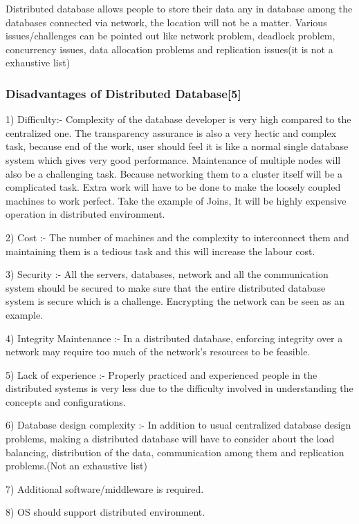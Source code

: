 \documentclass{article}[12pt,a4paper]
\begin{document}
Distributed database allows people to store their data any in database among the databases connected via network, the location will not be a matter. Various issues/challenges can be pointed out like network problem, deadlock problem, concurrency issues, data allocation problems and replication issues(it is not a exhaustive list)

\subsubsection {Disadvantages of Distributed Database[5]}

1) Difficulty:- Complexity of the database developer is very high compared to the centralized one. The transparency assurance is also a very hectic and complex task, because end of the work, user should feel it is like a normal single database system which gives very good performance. Maintenance of multiple nodes will also be a challenging task. Because networking them to a cluster itself will be a complicated task. Extra work will have to be done to make the loosely coupled machines to work perfect. Take the example of Joins, It will be highly expensive operation in distributed environment.

2) Cost :- The number of machines and the complexity to interconnect them and maintaining them is a tedious task and this will increase the labour cost. 

3) Security :- All the servers, databases, network and all the communication system should be secured to make sure that the entire distributed database system is secure which is a challenge. Encrypting the network can be seen as an example.

4) Integrity Maintenance :- In a distributed database, enforcing integrity over a network may require too much of the network's resources to be feasible.

5) Lack of experience :- Properly practiced and experienced people in the distributed systems is very less due to the difficulty involved in understanding the concepts and configurations.

6) Database design complexity :- In addition to usual centralized database design problems, making a distributed database will have to consider about the load balancing, distribution of the data, communication among them and replication problems.(Not an exhaustive list)

7) Additional software/middleware is required.

8) OS should support distributed environment.
\end{document}
